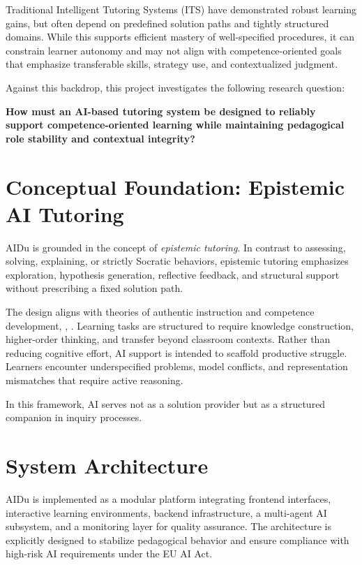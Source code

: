 \documentclass[10pt,twocolumn]{article}
\begin{document}
Traditional Intelligent Tutoring Systems (ITS) have demonstrated robust
learning gains\citep{anderson1995cognitive}, but often depend on
predefined solution paths and tightly structured domains. While this
supports efficient mastery of well-specified procedures, it can
constrain learner autonomy and may not align with competence-oriented
goals that emphasize transferable skills, strategy use, and
contextualized judgment.

Against this backdrop, this project investigates the following research
question:

\textbf{How must an AI-based tutoring system be designed to reliably
support competence-oriented learning while maintaining pedagogical role
stability and contextual integrity?}

\section{Conceptual Foundation: Epistemic AI
Tutoring}\label{conceptual-foundation-epistemic-ai-tutoring}

AIDu is grounded in the concept of \emph{epistemic tutoring}. In
contrast to assessing, solving, explaining, or strictly Socratic
behaviors, epistemic tutoring emphasizes exploration, hypothesis
generation, reflective feedback, and structural support without
prescribing a fixed solution path.

The design aligns with theories of authentic instruction and competence
development\citep{bransford2000howpeoplelearn},
\citep{newmann1996authentic}, \citep{wood1976scaffolding}.
Learning tasks are structured to require knowledge construction,
higher-order thinking, and transfer beyond classroom contexts. Rather
than reducing cognitive effort, AI support is intended to scaffold
productive struggle. Learners encounter underspecified problems, model
conflicts, and representation mismatches that require active reasoning.

In this framework, AI serves not as a solution provider but as a
structured companion in inquiry processes.

\section{System Architecture}\label{system-architecture}

AIDu is implemented as a modular platform integrating frontend
interfaces, interactive learning environments, backend infrastructure, a
multi-agent AI subsystem, and a monitoring layer for quality assurance.
The architecture is explicitly designed to stabilize pedagogical
behavior and ensure compliance with high-risk AI requirements under the
EU AI Act.
\end{document}
